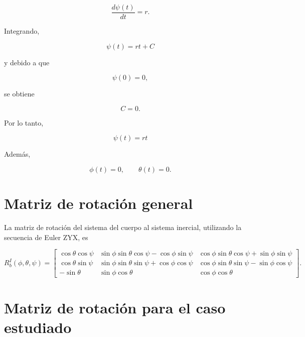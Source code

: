 \documentclass[11pt,a4paper]{article}
\begin{document}
\begin{equation}
\frac{d\psi(t)}{dt}=r.
\end{equation}

Integrando,

\begin{equation}
\boxed{
\psi(t)=rt+C
}
\end{equation}

y debido a que

\begin{equation}
\psi(0)=0,
\end{equation}

se obtiene

\begin{equation}
C=0.
\end{equation}

Por lo tanto,

\begin{equation}
\boxed{
\psi(t)=rt
}
\end{equation}

Además,

\begin{equation}
\phi(t)=0,
\qquad
\theta(t)=0.
\end{equation}


\section*{Matriz de rotación general}

La matriz de rotación del sistema del cuerpo al sistema inercial,
utilizando la secuencia de Euler ZYX, es

\begin{equation}
R_b^I(\phi,\theta,\psi)
=
\begin{bmatrix}
%
\cos\theta\cos\psi
&
\sin\phi\sin\theta\cos\psi-\cos\phi\sin\psi
&
\cos\phi\sin\theta\cos\psi+\sin\phi\sin\psi
\\[2mm]
%
\cos\theta\sin\psi
&
\sin\phi\sin\theta\sin\psi+\cos\phi\cos\psi
&
\cos\phi\sin\theta\sin\psi-\sin\phi\cos\psi
\\[2mm]
%
-\sin\theta
&
\sin\phi\cos\theta
&
\cos\phi\cos\theta
%
\end{bmatrix}.
\end{equation}


\section*{Matriz de rotación para el caso estudiado}
\end{document}
